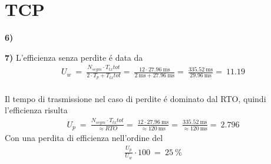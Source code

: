 \documentclass{article}
\newenvironment{homeworkProblem}[1][-1]{
    \section{TCP}
}{}
\begin{document}
\begin{homeworkProblem}
    \pagebreak
    \textbf{6)}
    
    \pagebreak
    \textbf{7)}
    L'efficienza senza perdite \'e data da
    \[
    	\begin{split}
    		U_w\ =\ \frac{N_{segm} \cdot T_{tx}tot}{2 \cdot T_{p} + T_{tx}tot}
    		=\ \frac{12 \cdot 27.96\ \text{ms}}{2\ \text{ms} + 27.96\ \text{ms}}
    		=\ \frac{335.52\ \text{ms}}{29.96\ \text{ms}}
    		=\ 11.19
    	\end{split}
    \]
   	\\
   	Il tempo di trasmissione nel caso di perdite \'e dominato dal RTO, quindi l'efficienza risulta
   	\[
    	\begin{split}
    		U_p\ =\ \frac{N_{segm} \cdot T_{tx}tot}{\approx RTO}
    		=\ \frac{12 \cdot 27.96\ \text{ms}}{\approx120\ \text{ms}}
    		=\ \frac{335.52\ \text{ms}}{\approx 120\ \text{ms}}
    		=\ 2.796
    	\end{split}
    \]
    Con una perdita di efficienza nell'ordine del
    \[
    	\begin{split}
    		\frac{U_p}{U_w} \cdot 100\ =\ 25\ \%
    	\end{split}
    \]

\end{homeworkProblem}
\end{document}
